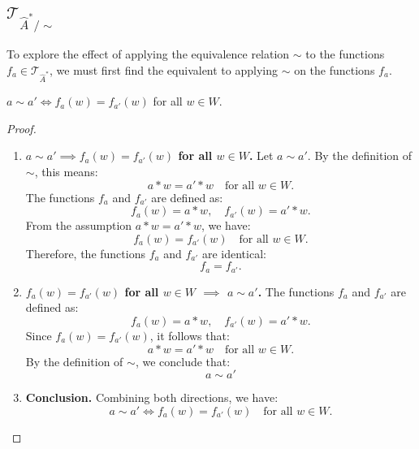 \subsection{$\mathcal{T}_{\hat{A}^{\ast}/\sim}$}

To explore the effect of applying the equivalence relation $\sim$ to the functions $f_{a} \in \mathcal{T}_{\hat{A}^{\ast}}$, we must first find the equivalent to applying $\sim$ on the functions $f_{a}$.

\begin{proposition}\label{prp:equivalence_equivalence_on_functions}
	$a \sim a' \iff f_{a}(w) = f_{a'}(w)$ for all $w \in W$.
\end{proposition}
\begin{proof}
	\begin{enumerate}
		\item \textbf{$a \sim a' \implies f_{a}(w) = f_{a'}(w)$ for all $w \in W$.}
		      Let $a \sim a'$. By the definition of $\sim$, this means:
		      \begin{equation}
			      a \ast w = a' \ast w \quad \text{for all } w \in W.
		      \end{equation}
		      The functions $f_{a}$ and $f_{a'}$ are defined as:
		      \begin{equation}
			      f_{a}(w) = a \ast w, \quad f_{a'}(w) = a' \ast w.
		      \end{equation}
		      From the assumption $a \ast w = a' \ast w$, we have:
		      \begin{equation}
			      f_{a}(w) = f_{a'}(w) \quad \text{for all } w \in W.
		      \end{equation}
		      Therefore, the functions $f_{a}$ and $f_{a'}$ are identical:
		      \begin{equation}
			      f_{a} = f_{a'}.
		      \end{equation}

		\item \textbf{$f_{a}(w) = f_{a'}(w)$ for all $w \in W$ $\implies$ $a \sim a'$.}
		      The functions $f_{a}$ and $f_{a'}$ are defined as:
		      \begin{equation}
			      f_{a}(w) = a \ast w, \quad f_{a'}(w) = a' \ast w.
		      \end{equation}
		      Since $f_{a}(w) = f_{a'}(w)$, it follows that:
		      \begin{equation}
			      a \ast w = a' \ast w \quad \text{for all } w \in W.
		      \end{equation}
		      By the definition of $\sim$, we conclude that:
		      \begin{equation}
			      a \sim a'
		      \end{equation}

		\item \textbf{Conclusion.}
		      Combining both directions, we have:
		      \begin{equation}
			      a \sim a' \iff f_{a}(w) = f_{a'}(w) \quad \text{for all } w \in W.
		      \end{equation}
	\end{enumerate}
\end{proof}

